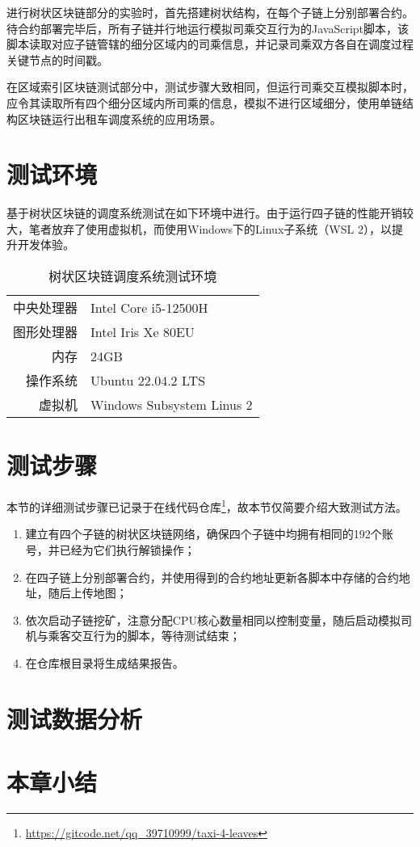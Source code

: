 进行树状区块链部分的实验时，首先搭建树状结构，在每个子链上分别部署合约。待合约部署完毕后，所有子链并行地运行模拟司乘交互行为的JavaScript脚本，该脚本读取对应子链管辖的细分区域内的司乘信息，并记录司乘双方各自在调度过程关键节点的时间戳。

在区域索引区块链测试部分中，测试步骤大致相同，但运行司乘交互模拟脚本时，应令其读取所有四个细分区域内所司乘的信息，模拟不进行区域细分，使用单链结构区块链运行出租车调度系统的应用场景。

\section{测试环境}

基于树状区块链的调度系统测试在如下环境中进行。由于运行四子链的性能开销较大，笔者放弃了使用虚拟机，而使用Windows下的Linux子系统（WSL 2），以提升开发体验。

\begin{table}[htbp]
    \linespread{1.5}
    \centering
    \caption{树状区块链调度系统测试环境}\label{树状区块链调度系统测试环境}
    \begin{tabular}{r|l} \toprule
        中央处理器 & Intel Core i5-12500H      \\
        图形处理器 & Intel Iris Xe 80EU        \\
        内存    & 24GB                      \\
        操作系统  & Ubuntu 22.04.2 LTS        \\
        虚拟机   & Windows Subsystem Linus 2 \\
        \bottomrule
    \end{tabular}
\end{table}

\section{测试步骤}

本节的详细测试步骤已记录于在线代码仓库\footnote{\url{https://gitcode.net/qq_39710999/taxi-4-leaves}}，故本节仅简要介绍大致测试方法。

\begin{enumerate}
    \item 建立有四个子链的树状区块链网络，确保四个子链中均拥有相同的192个账号，并已经为它们执行解锁操作；
    \item 在四子链上分别部署合约，并使用得到的合约地址更新各脚本中存储的合约地址，随后上传地图；
    \item 依次启动子链挖矿，注意分配CPU核心数量相同以控制变量，随后启动模拟司机与乘客交互行为的脚本，等待测试结束；
    \item 在仓库根目录将生成结果报告。
\end{enumerate}

\section{测试数据分析}

\section{本章小结}
